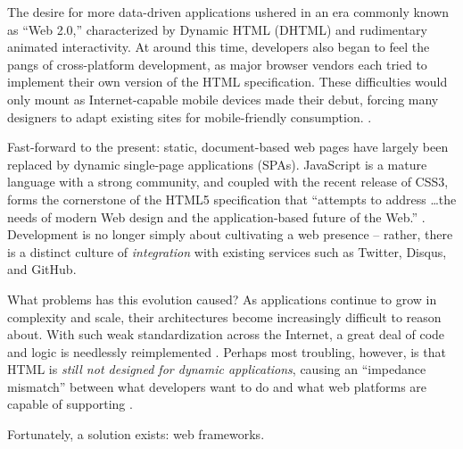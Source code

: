 \documentclass[12pt,letterpaper]{article}
\begin{document}
The desire for more data-driven applications ushered in an era commonly known as ``Web 2.0,'' characterized by Dynamic HTML (DHTML) and rudimentary animated interactivity. At around this time, developers also began to feel the pangs of cross-platform development, as major browser vendors each tried to implement their own version of the HTML specification. These difficulties would only mount as Internet-capable mobile devices made their debut, forcing many designers to adapt existing sites for mobile-friendly consumption. \cite{Schlensker:2014}.

Fast-forward to the present: static, document-based web pages have largely been replaced by dynamic single-page applications (SPAs). JavaScript is a mature language with a strong community, and coupled with the recent release of CSS3, forms the cornerstone of the HTML5 specification that ``attempts to address \ldots the needs of modern Web design and the application-based future of the Web.'' \cite[p.~14]{Sklar:2012}. Development is no longer simply about cultivating a web presence -- rather, there is a distinct culture of \emph{integration} with existing services such as Twitter, Disqus, and GitHub.

What problems has this evolution caused? As applications continue to grow in complexity and scale, their architectures become increasingly difficult to reason about. With such weak standardization across the Internet, a great deal of code and logic is needlessly reimplemented \cite{Schlensker:2014}. Perhaps most troubling, however, is that HTML is \emph{still not designed for dynamic applications}, causing an ``impedance mismatch'' between what developers want to do and what web platforms are capable of supporting \cite{Angular:Docs, Hunt:2014}.



Fortunately, a solution exists: web frameworks.






\end{document}
